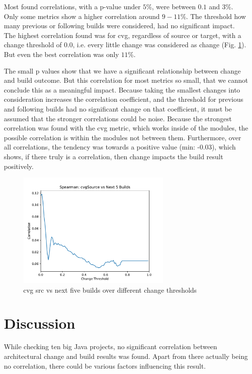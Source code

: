\documentclass[conference]{IEEEtran}
\begin{document}
Most found correlations, with a p-value under $5\%$, were between $0.1$ and $3\%$. Only some metrics show a higher correlation around $9-11\%$. The threshold how many previous or following builds were considered, had no significant impact. The highest correlation found was for cvg, regardless of source or target, with a change threshold of $0.0$, i.e. every little change was considered as change (Fig. \ref{cvgPlot}). But even the best correlation was only $11\%$. 

The small p values show that we have a significant relationship between change and build outcome. But this correlation for most metrics so small, that we cannot conclude this as a meaningful impact. Because taking the smallest changes into consideration increases the correlation coefficient, and the threshold for previous and following builds had no significant change on that coefficient, it must be assumed that the stronger correlations could be noise. Because the strongest correlation was found with the cvg metric, which works inside of the modules, the possible correlation is within the modules not between them. Furthermore, over all correlations, the tendency was towards a positive value (min: -0.03), which shows, if there truly is a correlation, then change impacts the build result positively. 

\begin{figure}[!t]
	\centering
	\includegraphics[width=3in]{assets/cvgSourceCorrPlot}
	\caption{cvg src vs next five builds over different change thresholds }
	\label{cvgPlot}
\end{figure}

\section{Discussion}

While checking ten big Java projects, no significant correlation between architectural change and build results was found. Apart from there actually being no correlation, there could be various factors influencing this result. 
\end{document}
